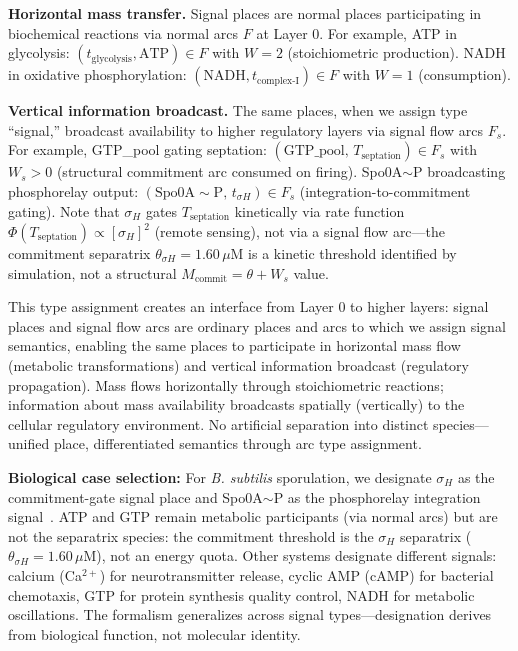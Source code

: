 \documentclass[10pt,letterpaper]{article}
\begin{document}
\vspace{3pt}
\noindent\textbf{Horizontal mass transfer.} Signal places are normal places participating in biochemical reactions via normal arcs $F$ at Layer 0. For example, ATP in glycolysis: $(t_{\text{glycolysis}}, \text{ATP}) \in F$ with $W = 2$ (stoichiometric production). NADH in oxidative phosphorylation: $(\text{NADH}, t_{\text{complex-I}}) \in F$ with $W = 1$ (consumption).

\vspace{3pt}
\noindent\textbf{Vertical information broadcast.} The same places, when we assign type ``signal,'' broadcast availability to higher regulatory layers via signal flow arcs $F_s$. For example, GTP\_pool gating septation: $(\text{GTP\_pool},\, T_{\text{septation}}) \in F_s$ with $W_s > 0$ (structural commitment arc consumed on firing). Spo0A$\sim$P broadcasting phosphorelay output: $(\text{Spo0A}{\sim}\text{P},\, t_{\sigma H}) \in F_s$ (integration-to-commitment gating). Note that $\sigma_H$ gates $T_{\text{septation}}$ kinetically via rate function $\Phi(T_{\text{septation}}) \propto [\sigma_H]^2$ (remote sensing), not via a signal flow arc---the commitment separatrix $\theta_{\sigma H} = 1.60\,\mu$M is a kinetic threshold identified by simulation, not a structural $M_{\text{commit}} = \theta + W_s$ value.

This type assignment creates an interface from Layer 0 to higher layers: signal places and signal flow arcs are ordinary places and arcs to which we assign signal semantics, enabling the same places to participate in horizontal mass flow (metabolic transformations) and vertical information broadcast (regulatory propagation). Mass flows horizontally through stoichiometric reactions; information about mass availability broadcasts spatially (vertically) to the cellular regulatory environment. No artificial separation into distinct species---unified place, differentiated semantics through arc type assignment.

\textbf{Biological case selection:} For \textit{B. subtilis} sporulation, we designate $\sigma_H$ as the commitment-gate signal place and Spo0A$\sim$P as the phosphorelay integration signal~\cite{fujita2005}. ATP and GTP remain metabolic participants (via normal arcs) but are not the separatrix species: the commitment threshold is the $\sigma_H$ separatrix ($\theta_{\sigma H} = 1.60\,\mu$M), not an energy quota. Other systems designate different signals: calcium (Ca$^{2+}$) for neurotransmitter release, cyclic AMP (cAMP) for bacterial chemotaxis, GTP for protein synthesis quality control, NADH for metabolic oscillations. The formalism generalizes across signal types---designation derives from biological function, not molecular identity.
\end{document}
